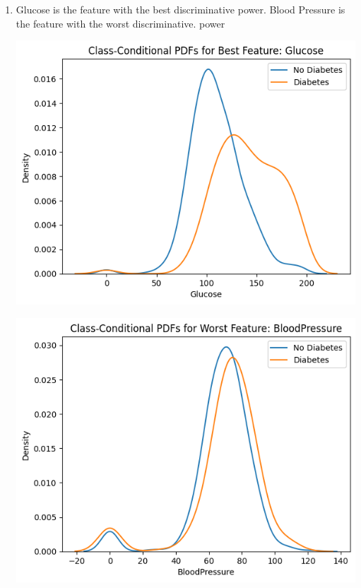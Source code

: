 \documentclass{article}
\begin{document}
\begin{enumerate}[leftmargin=\labelsep]
\begin{enumerate}[leftmargin=\labelsep]
\item Glucose is the feature with the best discriminative power.
Blood Pressure is the feature with the worst discriminative. power
\begin{center}
    \begin{minipage}[t]{0.45\textwidth}
        \centering
        \includegraphics[width=\textwidth]{img/best_disc_feature.png} 
    \end{minipage}
    \hfill
    \begin{minipage}[t]{0.45\textwidth}
        \centering
        \includegraphics[width=\textwidth]{img/worst_dict_feature.png} 
    \end{minipage}
\end{center}



\end{enumerate}
\end{enumerate}
\end{document}
